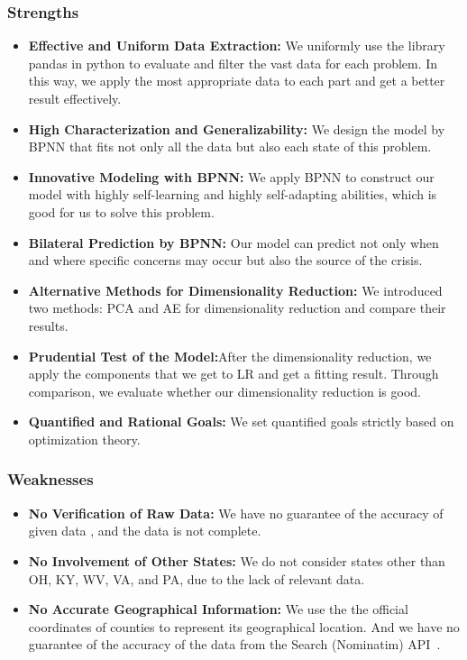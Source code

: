 \documentclass{mcmthesis}
\begin{document}
\subsubsection{Strengths}
\begin{itemize}
\item \textbf {Effective and Uniform Data Extraction:} We uniformly use the library pandas in python  to evaluate and filter the vast data for each problem. In this way, we apply the most appropriate data to each part and get a better result effectively.

\item \textbf{High Characterization and Generalizability:} We design the model by BPNN that fits not only all the data but also each state of this problem.

\item \textbf{Innovative Modeling with BPNN:} We apply BPNN to construct our model with highly self-learning and highly self-adapting abilities, which is good for us to solve this problem.

\item \textbf{Bilateral Prediction by BPNN:} Our model can predict not only when and where specific concerns may occur but also the source of the crisis.

\item \textbf{Alternative Methods for Dimensionality Reduction:} We introduced two methods: PCA and AE for dimensionality reduction and compare their results.

\item \textbf{Prudential Test of the Model:}After the dimensionality reduction, we apply the components that we get to LR and get a fitting result. Through comparison, we evaluate whether our dimensionality reduction is good.

\item \textbf{Quantified and Rational Goals:} We set quantified goals strictly based on optimization theory.
\end{itemize}


\subsubsection{Weaknesses}
\begin{itemize}
\item \textbf{No Verification of Raw Data:} We have no guarantee of the accuracy of given data , and the data is not complete.
\item \textbf{No Involvement of Other States:} We do not consider states other than OH, KY, WV, VA, and PA, due to the lack of relevant data.
\item \textbf{No Accurate Geographical Information: } We use the the official coordinates of counties to represent its geographical location. And we have no guarantee of the accuracy of the data  from the Search (Nominatim) API~\cite{NO}.
\end{itemize}
\end{document}
